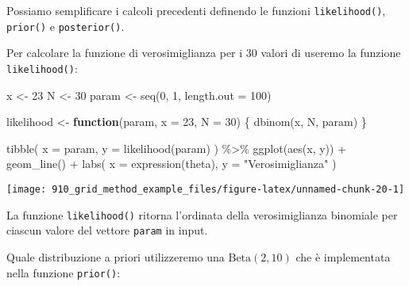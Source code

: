 \documentclass[
]{memoir}
\newenvironment{Shaded}{\begin{snugshade}}{\end{snugshade}}
\newcommand{\AttributeTok}[1]{\textcolor[rgb]{0.77,0.63,0.00}{#1}}
\newcommand{\ControlFlowTok}[1]{\textcolor[rgb]{0.13,0.29,0.53}{\textbf{#1}}}
\newcommand{\DecValTok}[1]{\textcolor[rgb]{0.00,0.00,0.81}{#1}}
\newcommand{\FunctionTok}[1]{\textcolor[rgb]{0.00,0.00,0.00}{#1}}
\newcommand{\NormalTok}[1]{#1}
\newcommand{\OtherTok}[1]{\textcolor[rgb]{0.56,0.35,0.01}{#1}}
\newcommand{\SpecialCharTok}[1]{\textcolor[rgb]{0.00,0.00,0.00}{#1}}
\newcommand{\StringTok}[1]{\textcolor[rgb]{0.31,0.60,0.02}{#1}}
\begin{document}
Possiamo semplificare i calcoli precedenti definendo le funzioni \texttt{likelihood()}, \texttt{prior()} e \texttt{posterior()}.

Per calcolare la funzione di verosimiglianza per i 30 valori di \citet{zetschefuture2019} useremo la funzione \texttt{likelihood()}:

\begin{Shaded}
\begin{Highlighting}[]
\NormalTok{x }\OtherTok{\textless{}{-}} \DecValTok{23}
\NormalTok{N }\OtherTok{\textless{}{-}} \DecValTok{30}
\NormalTok{param }\OtherTok{\textless{}{-}} \FunctionTok{seq}\NormalTok{(}\DecValTok{0}\NormalTok{, }\DecValTok{1}\NormalTok{, }\AttributeTok{length.out =} \DecValTok{100}\NormalTok{)}

\NormalTok{likelihood }\OtherTok{\textless{}{-}} \ControlFlowTok{function}\NormalTok{(param, }\AttributeTok{x =} \DecValTok{23}\NormalTok{, }\AttributeTok{N =} \DecValTok{30}\NormalTok{) \{}
  \FunctionTok{dbinom}\NormalTok{(x, N, param)}
\NormalTok{\}}

\FunctionTok{tibble}\NormalTok{(}
  \AttributeTok{x =}\NormalTok{ param,}
  \AttributeTok{y =} \FunctionTok{likelihood}\NormalTok{(param)}
\NormalTok{) }\SpecialCharTok{\%\textgreater{}\%}
  \FunctionTok{ggplot}\NormalTok{(}\FunctionTok{aes}\NormalTok{(x, y)) }\SpecialCharTok{+}
  \FunctionTok{geom\_line}\NormalTok{() }\SpecialCharTok{+}
  \FunctionTok{labs}\NormalTok{(}
    \AttributeTok{x =} \FunctionTok{expression}\NormalTok{(theta),}
    \AttributeTok{y =} \StringTok{"Verosimiglianza"}
\NormalTok{  )}
\end{Highlighting}
\end{Shaded}

\begin{center}\texttt{[image: 910\_grid\_method\_example\_files/figure-latex/unnamed-chunk-20-1]} \end{center}

\noindent
La funzione \texttt{likelihood()} ritorna l'ordinata della verosimiglianza binomiale per ciascun valore del vettore \texttt{param} in input.

Quale distribuzione a priori utilizzeremo una \(\mbox{Beta}(2, 10)\) che è implementata nella funzione \texttt{prior()}:
\end{document}
